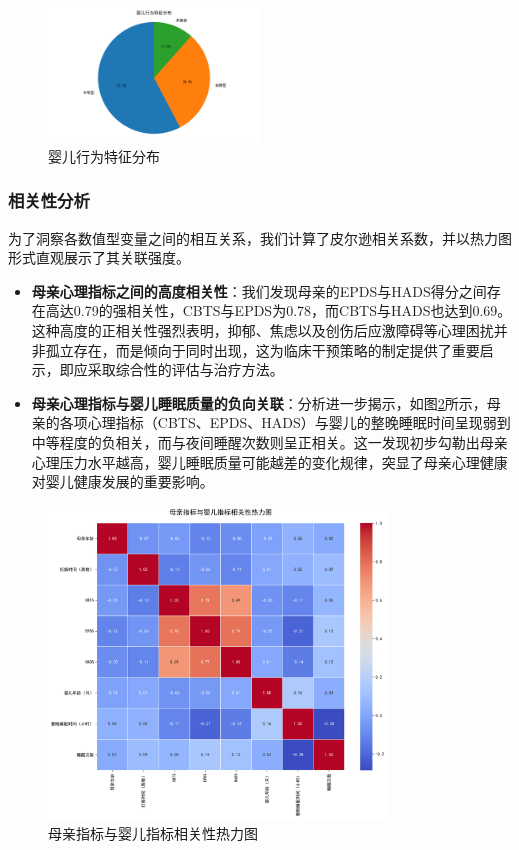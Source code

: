 \documentclass[withoutpreface,bwprint]{cumcmthesis}
\begin{document}
\begin{figure}[htbp]
    \centering
    \includegraphics[width=0.5\textwidth]{figures/baby_behavior_distribution.png}
    \caption{婴儿行为特征分布}
    \label{fig:baby_behavior_distribution}
\end{figure}

\subsubsection{相关性分析}
为了洞察各数值型变量之间的相互关系，我们计算了皮尔逊相关系数，并以热力图形式直观展示了其关联强度。
\begin{itemize}
    \item \textbf{母亲心理指标之间的高度相关性}：我们发现母亲的EPDS与HADS得分之间存在高达0.79的强相关性，CBTS与EPDS为0.78，而CBTS与HADS也达到0.69。这种高度的正相关性强烈表明，抑郁、焦虑以及创伤后应激障碍等心理困扰并非孤立存在，而是倾向于同时出现，这为临床干预策略的制定提供了重要启示，即应采取综合性的评估与治疗方法。
    \item \textbf{母亲心理指标与婴儿睡眠质量的负向关联}：分析进一步揭示，如图\ref{fig:correlation_heatmap}所示，母亲的各项心理指标（CBTS、EPDS、HADS）与婴儿的整晚睡眠时间呈现弱到中等程度的负相关，而与夜间睡醒次数则呈正相关。这一发现初步勾勒出母亲心理压力水平越高，婴儿睡眠质量可能越差的变化规律，突显了母亲心理健康对婴儿健康发展的重要影响。
\end{itemize}

\begin{figure}[htbp]
    \centering
    \includegraphics[width=0.8\textwidth]{figures/correlation_heatmap.png}
    \caption{母亲指标与婴儿指标相关性热力图}
    \label{fig:correlation_heatmap}
\end{figure}
\end{document}
